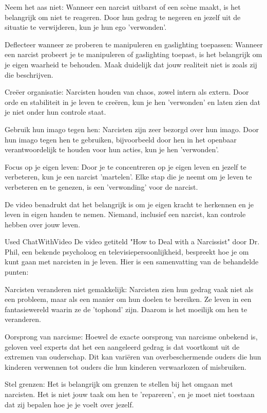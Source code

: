 Neem het aas niet: Wanneer een narcist uitbarst of een scène maakt, is het belangrijk om niet te reageren. Door hun gedrag te negeren en jezelf uit de situatie te verwijderen, kun je hun ego 'verwonden'.

Deflecteer wanneer ze proberen te manipuleren en gaslighting toepassen: Wanneer een narcist probeert je te manipuleren of gaslighting toepast, is het belangrijk om je eigen waarheid te behouden. Maak duidelijk dat jouw realiteit niet is zoals zij die beschrijven.

Creëer organisatie: Narcisten houden van chaos, zowel intern als extern. Door orde en stabiliteit in je leven te creëren, kun je hen 'verwonden' en laten zien dat je niet onder hun controle staat.

Gebruik hun imago tegen hen: Narcisten zijn zeer bezorgd over hun imago. Door hun imago tegen hen te gebruiken, bijvoorbeeld door hen in het openbaar verantwoordelijk te houden voor hun acties, kun je hen 'verwonden'.

Focus op je eigen leven: Door je te concentreren op je eigen leven en jezelf te verbeteren, kun je een narcist 'martelen'. Elke stap die je neemt om je leven te verbeteren en te genezen, is een 'verwonding' voor de narcist.

De video benadrukt dat het belangrijk is om je eigen kracht te herkennen en je leven in eigen handen te nemen. Niemand, inclusief een narcist, kan controle hebben over jouw leven.

Used ChatWithVideo
De video getiteld "How to Deal with a Narcissist" door Dr. Phil, een bekende psycholoog en televisiepersoonlijkheid, bespreekt hoe je om kunt gaan met narcisten in je leven. Hier is een samenvatting van de behandelde punten:

Narcisten veranderen niet gemakkelijk: Narcisten zien hun gedrag vaak niet als een probleem, maar als een manier om hun doelen te bereiken. Ze leven in een fantasiewereld waarin ze de 'tophond' zijn. Daarom is het moeilijk om hen te veranderen.

Oorsprong van narcisme: Hoewel de exacte oorsprong van narcisme onbekend is, geloven veel experts dat het een aangeleerd gedrag is dat voortkomt uit de extremen van ouderschap. Dit kan variëren van overbeschermende ouders die hun kinderen verwennen tot ouders die hun kinderen verwaarlozen of misbruiken.

Stel grenzen: Het is belangrijk om grenzen te stellen bij het omgaan met narcisten. Het is niet jouw taak om hen te 'repareren', en je moet niet toestaan dat zij bepalen hoe je je voelt over jezelf.

